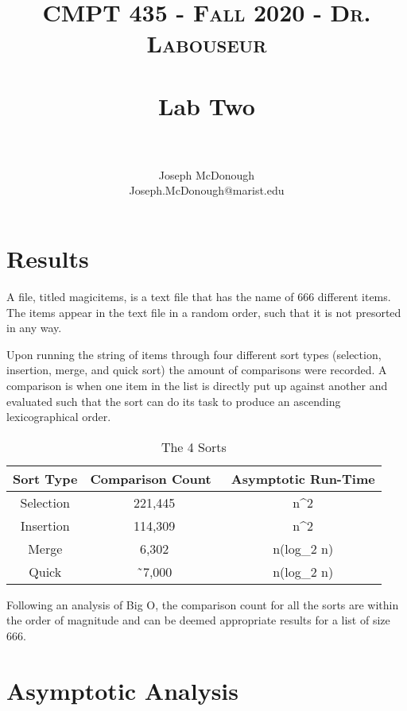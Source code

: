 \documentclass[letterpaper, 10pt,DIV=13]{scrartcl}
\title{	
   \normalfont \normalsize 
   \textsc{CMPT 435 - Fall 2020 - Dr. Labouseur} \\[10pt] %
   \horrule{0.5pt} \\[0.25cm] 	%
   \huge Lab Two  \\     	    %
   \horrule{0.5pt} \\[0.25cm] 	%
}
\author{Joseph McDonough \\ \normalsize Joseph.McDonough@marist.edu}
\date{\normalize{October 2, 2020}}	%
\numberwithin{equation}{section} %
\numberwithin{figure}{section} %
\numberwithin{table}{section} %
\begin{document}
\maketitle %

\section{Results}

A file, titled magicitems, is a text file that has the name of 666 different items.  The items appear in the text file in a random order, such that it is not presorted in any way. 

Upon running the string of items through four different sort types (selection, insertion, merge, and quick sort) the amount of comparisons were recorded.  A comparison is when one item in the list is directly put up against another and evaluated such that the sort can do its task to produce an ascending lexicographical order.  

\begin{table}[h!]
  \begin{center}
    \caption{The 4 Sorts}
    \label{tab:table}
    \begin{tabular}{c|c|c}
      \textbf{Sort Type} & \textbf{Comparison Count}\ & \textbf{Asymptotic Run-Time}\\
      \hline
      Selection & 221,445 & n^2 \\
      Insertion & 114,309 & n^2\\
      Merge & 6,302 & \n n(log_2 n) \\
      Quick & \~\ 7,000 & \n n(log_2 n)\\
    \end{tabular}
  \end{center}
\end{table}

Following an analysis of Big O, the comparison count for all the sorts are within the order of magnitude and can be deemed appropriate results for a list of size 666.

\section{Asymptotic Analysis} \\
\end{document}
